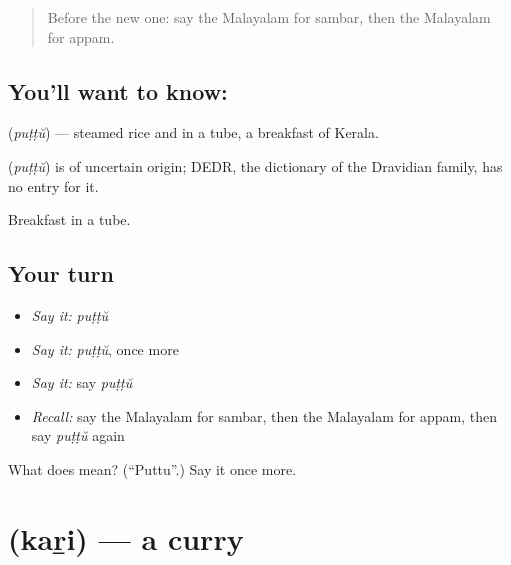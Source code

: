 \label{lesson:ML-C132-puttu}



\begin{quote}
Before the new one: say the Malayalam for sambar, then the Malayalam for appam.
\end{quote}

\subsection*{You'll want to know: }
\textbf{} (\emph{puṭṭŭ}) — steamed rice and \textbf{} in a tube, a breakfast of Kerala.

\begin{cousinweb}
\textbf{} (\emph{puṭṭŭ}) is of uncertain origin; DEDR, the dictionary of the Dravidian family, has no entry for it.
\end{cousinweb}

\begin{grammarlens}[title={What you've built}]
Breakfast in a tube.
\end{grammarlens}

\subsection*{Your turn}
\begin{itemize}
\raggedright
  \item \emph{Say it:} \emph{puṭṭŭ}
  \item \emph{Say it:} \emph{puṭṭŭ}, once more
  \item \emph{Say it:} say \emph{puṭṭŭ}
  \item \emph{Recall:} say the Malayalam for sambar, then the Malayalam for appam, then say \emph{puṭṭŭ} again
\end{itemize}

\begin{tcolorbox}[breakable,colback=teal!4,colframe=teal!35!black,title={Before you move on}]
What does  mean? (\textquotedblleft{}Puttu\textquotedblright{}.) Say it once more.
\end{tcolorbox}
\section[\texorpdfstring{\ml{കറി} (kaṟi)}{കറി (kaṟi)}]{ (kaṟi) — a curry}

\label{lesson:ML-C132-curry}



